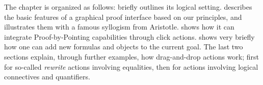 The chapter is organized as follows:  briefly outlines its
logical setting.  describes the basic features of a graphical
proof interface based on our principles, and illustrates them with a famous
syllogism from Aristotle.  shows how it can integrate
Proof-by-Pointing capabilities through click actions.  shows
very briefly how one can add new formulas and objects to the current goal. The
last two sections explain, through further examples, how drag-and-drop actions
work; first for so-called \emph{rewrite} actions involving equalities, then for
actions involving logical connectives and quantifiers.






